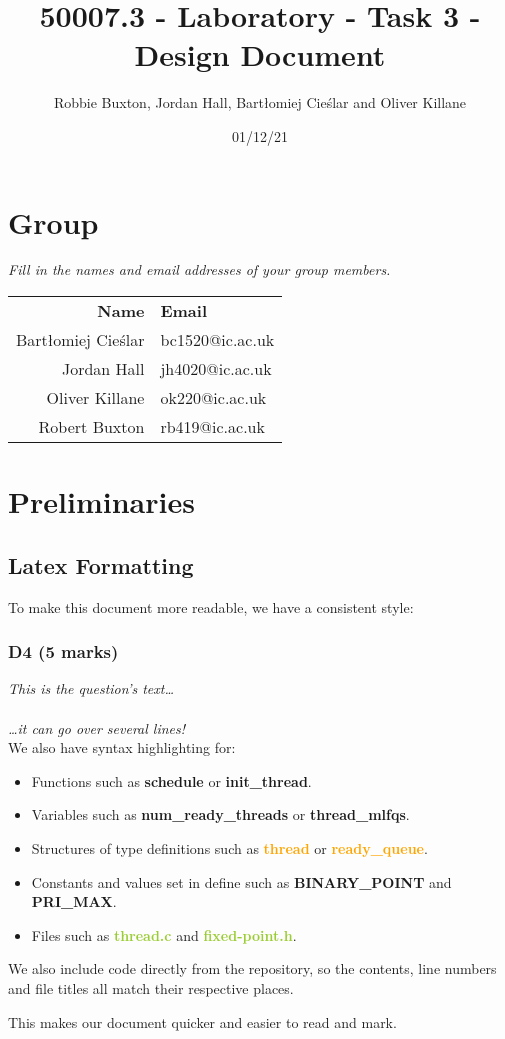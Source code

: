 \documentclass{report}
\title{50007.3 - Laboratory - Task 3 - Design Document}
\author{Robbie Buxton, Jordan Hall, Bartłomiej Cieślar and Oliver Killane}
\date{01/12/21}
\newcommand{\question}[1]{\textit{#1} \ }
\newcommand{\fun}[1]{\textcolor{Emerald}{\textbf{#1}}}
\newcommand{\file}[1]{\textcolor{YellowGreen}{\textbf{#1}}}
\newcommand{\struct}[1]{\textcolor{orange}{\textbf{#1}}}
\newcommand{\var}[1]{\textcolor{RoyalPurple}{\textbf{#1}}}
\newcommand{\const}[1]{\textcolor{BrickRed}{\textbf{#1}}}
\newcommand{\pintoscode}[4]{}
\begin{document}
	\maketitle

	\section*{Group}
		\question{Fill in the names and email addresses of your group members.}
		\begin{center}
			\begin{tabular}{r l}
				\textbf{Name} & \textbf{Email} \\
				Bartłomiej Cieślar & bc1520@ic.ac.uk \\
				Jordan Hall & jh4020@ic.ac.uk \\
				Oliver Killane & ok220@ic.ac.uk \\
				Robert Buxton & rb419@ic.ac.uk \\
			\end{tabular}
		\end{center}
	
	\section*{Preliminaries}
		\subsection*{Latex Formatting}
		To make this document more readable, we have a consistent style:
		\subsubsection*{D4 (5 marks)}
		\question{This is the question's text\dots
		\\
		\\ \dots it can go over several lines!}
		\\ We also have syntax highlighting for:
		\begin{itemize}
			\item Functions such as \fun{schedule} or \fun{init\_thread}.
			\item Variables such as \var{num\_ready\_threads} or \var{thread\_mlfqs}.
			\item Structures of type definitions such as \struct{thread} or \struct{ready\_queue}.
			\item Constants and values set in define such as \const{BINARY\_POINT} and \const{PRI\_MAX}.
			\item Files such as \file{thread.c} and \file{fixed-point.h}.
		\end{itemize}
		We also include code directly from the repository, so the contents, line 
		numbers and file titles all match their respective places.
		\pintoscode{98}{110}{\file{syscall.c}}{/../userprog/syscall.c}
		This makes our document quicker and easier to read and mark.
\end{document}
